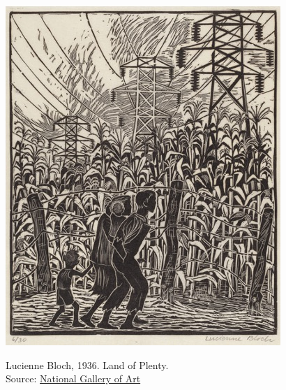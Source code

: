 \documentclass{beamer}
\begin{document}
\begin{frame}
\includegraphics[height = .8\textheight]{figures/land_of_plenty}\\
\begin{footnotesize}
Lucienne Bloch, 1936. Land of Plenty.\\
Source: \href{https://www.nga.gov/learn/teachers/lessons-activities/uncovering-america/great-depression.html}{National Gallery of Art}
\end{footnotesize}
\end{frame}
\end{document}
